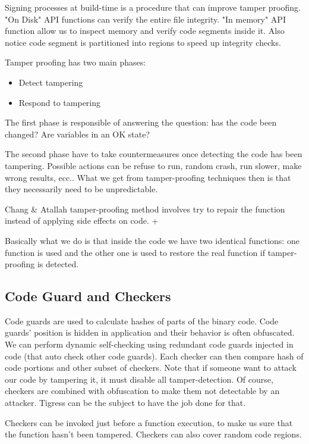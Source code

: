 Signing processes at build-time is a procedure that can improve tamper proofing. 
"On Disk" API functions can verify the entire file integrity.
"In memory" API function allow us to inspect memory and verify code segments inside it. 
Also notice code segment is partitioned into regions to speed up integrity checks.

Tamper proofing has two main phases: 
\begin{itemize}
    \item Detect tampering 
    \item Respond to tampering
\end{itemize}

The first phase is responsible of answering the question: has the code been changed? Are variables in an OK state?
\par 
The second phase have to take countermeasures once detecting the code has been tampering. 
Possible actions can be refuse to run, random crash, run slower, make wrong results, ecc..
What we get from tamper-proofing techniques then is that they necessarily need to be unpredictable.

Chang & Atallah tamper-proofing method involves try to repair the function instead of applying side effects on code. +
\par
Basically what we do is that inside the code we have two identical functions: one function is used and the other one is used to restore the real function if tamper-proofing is detected.  

\subsection{Code Guard and Checkers}

Code guards are used to calculate hashes of parts of the binary code.
Code guards' position is hidden in application and their behavior is often obfuscated.
We can perform dynamic self-checking using redundant code guards injected in code (that auto check other code guards). 
Each checker can then compare hash of code portions and other subset of checkers. Note that if someone want to attack our code by tampering it, it must disable all tamper-detection. Of course, checkers are combined with obfuscation to make them not detectable by an attacker. Tigress can be the subject to have the job done for that. 
\par 
Checkers can be invoked just before a function execution, to make us sure that the function hasn't been tampered.
Checkers can also cover random code regions.